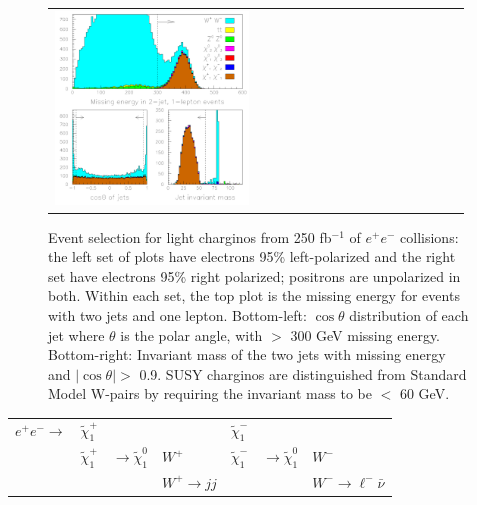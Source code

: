 \documentclass[12pt]{article}
\begin{document}
\begin{figure}[t]
\begin{center}
\begin{tabular}{p{0.49\linewidth} p{0.49\linewidth}}
      \begin{minipage}{\linewidth} \includegraphics[width=\linewidth]{jimpcharginocuts_b} \end{minipage}
    \end{tabular}

    \caption{Event selection for light charginos from 250 fb$^{-1}$ of
    $e^+e^-$ collisions: the left set of plots have electrons 95\%
    left-polarized and the right set have electrons 95\% right
    polarized; positrons are unpolarized in both.  Within each set,
    the top plot is the missing energy for events with two jets and
    one lepton.  Bottom-left: $\cos\theta$ distribution of each jet
    where $\theta$ is the polar angle, with $>$ 300 GeV missing
    energy.  Bottom-right: Invariant mass of the two jets with missing
    energy and $|\cos\theta| >$ 0.9.  SUSY charginos are distinguished
    from Standard Model W-pairs by requiring the invariant mass to be
    $<$ 60 GeV.}

    \label{jimpcharginocuts}
  \end{center}
\end{figure}

\begin{center}
  \begin{tabular}{l l l l l l l}
    $e^+e^- \to $ & $\tilde{\chi}^+_1$ & & & $\tilde{\chi}^-_1$ & & \\
    & $\tilde{\chi}^+_1$ & $\to \tilde{\chi}^0_1$ & $W^+$ & $\tilde{\chi}^-_1$ & $\to \tilde{\chi}^0_1$ & $W^-$ \\
    & & & $W^+ \to jj$ & & & $W^- \to \ell^- \bar{\nu}$ \\
  \end{tabular}
\end{center}
\end{document}
